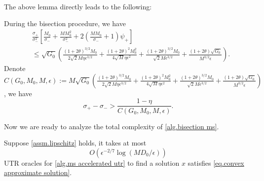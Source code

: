 \documentclass{article}
\begin{document}
The above lemma directly leads to the following:
\begin{corollary}
    \label{coro.bisection bound}
    During the bisection procedure, we have
    \begin{equation*}
    \begin{aligned}
        &\frac{\sigma_+}{\sigma_-^2}\left[\frac{M_0}{\sigma_-}+\frac{MM_0^2}{\sigma_-^2}+2\left(\frac{MM_0}{\sigma_-}+1\right)\psi_+
             \right]\\
             &\leq \sqrt{G_0}\left(\frac{(1+2\theta)^{3/2}M_0}{2\sqrt{2}M\eta \epsilon^{3/2}}+\frac{(1+2\theta)^2M_0^2}{4\sqrt{M}\eta\epsilon^2}+\frac{(1+2\theta)^{3/2}M_0}{\sqrt{2}M\epsilon^{3/2}}+\frac{(1+2\theta)\sqrt{G_0}}{M^{3/2}\epsilon}\right).
    \end{aligned}
    \end{equation*}
    Denote $C(G_0,M_0,M,\epsilon):= M\sqrt{G_0}\left(\frac{(1+2\theta)^{3/2}M_0}{2\sqrt{2}M\eta \epsilon^{3/2}}+\frac{(1+2\theta)^2M_0^2}{4\sqrt{M}\eta\epsilon^2}+\frac{(1+2\theta)^{3/2}M_0}{\sqrt{2}M\epsilon^{3/2}}+\frac{(1+2\theta)\sqrt{G_0}}{M^{3/2}\epsilon}\right)$                                     
                                , we have
    \begin{equation}
        \label{eq.bound value by brackets}
        \sigma_+-\sigma_->\frac{1-\eta}{C(G_0,M_0,M,\epsilon)}.
    \end{equation}
\end{corollary}
Now we are ready to analyze the total complexity of \autoref{alg.bisection ms}.
\begin{theorem}
    \label{thm.final complexity of msatr}
    Suppose \autoref{assm.lipschitz} holds, it takes at most 
    \begin{equation}
        \label{eq.final complexity of msatr}
        O\left(\epsilon^{-2/7}\log\left(MD_0/\epsilon\right)\right)
    \end{equation}
    UTR oracles for \autoref{alg.ms accelerated utr} to find a solution $x$ satisfies \eqref{eq.convex approximate solution}.
\end{theorem}
\end{document}

